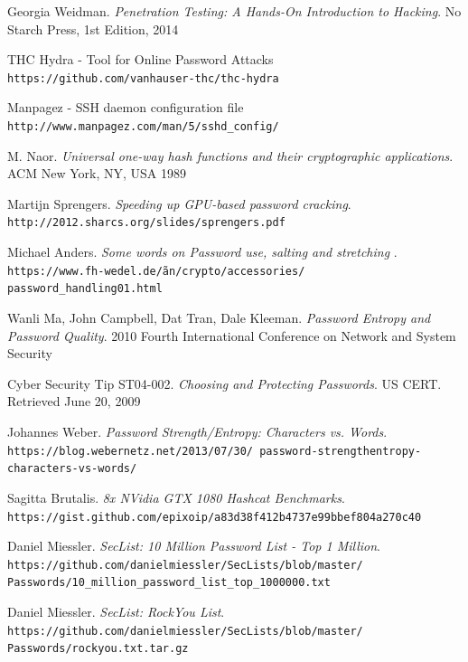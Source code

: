 \documentclass[11pt, a4paper]{article}
\begin{document}
\begin{thebibliography}{99}

Georgia Weidman.
\textit{Penetration Testing: A Hands-On Introduction to Hacking}.
No Starch Press, 1st Edition, 2014

THC Hydra - Tool for Online Password Attacks
\\\texttt{https://github.com/vanhauser-thc/thc-hydra}

Manpagez - SSH daemon configuration file
\\\texttt{http://www.manpagez.com/man/5/sshd\_config/}

M. Naor.
\textit{Universal one-way hash functions and their cryptographic applications}.
ACM New York, NY, USA 1989

Martijn Sprengers.
\textit{Speeding up GPU-based password cracking}.
\\\texttt{http://2012.sharcs.org/slides/sprengers.pdf}

Michael Anders.
\textit{Some words on Password use, salting and stretching }.
\\\texttt{https://www.fh-wedel.de/\~an/crypto/accessories/ password\_handling01.html}

Wanli Ma, John Campbell, Dat Tran, Dale Kleeman.
\textit{Password Entropy and Password Quality}.
2010 Fourth International Conference on Network and System Security

Cyber Security Tip ST04-002.
\textit{Choosing and Protecting Passwords}.
US CERT. Retrieved June 20, 2009

Johannes Weber.
\textit{Password Strength/Entropy: Characters vs. Words}.
\\\texttt{https://blog.webernetz.net/2013/07/30/ password-strengthentropy-characters-vs-words/}

Sagitta Brutalis.
\textit{8x NVidia GTX 1080 Hashcat Benchmarks}.
\\\texttt{https://gist.github.com/epixoip/a83d38f412b4737e99bbef804a270c40}

Daniel Miessler.
\textit{SecList: 10 Million Password List - Top 1 Million}.
\\\texttt{https://github.com/danielmiessler/SecLists/blob/master/ Passwords/10\_million\_password\_list\_top\_1000000.txt}

Daniel Miessler.
\textit{SecList: RockYou List}.
\\\texttt{https://github.com/danielmiessler/SecLists/blob/master/
Passwords/rockyou.txt.tar.gz}


\end{thebibliography}
\end{document}
